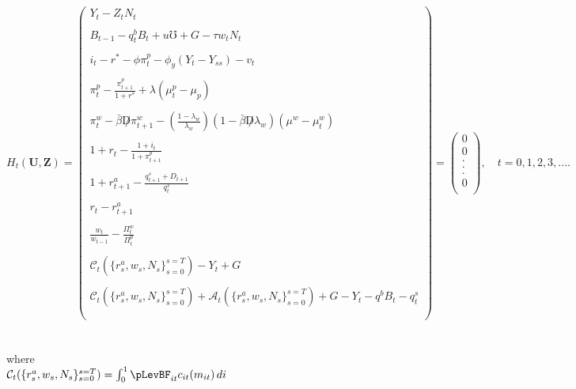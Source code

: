 \documentclass[titlepage]{\econtex}\providecommand{\texname}{FBS-NK}
\begin{document}
$$
H_{t}(\mathbf{U},\mathbf{Z})= \begin{pmatrix} 
 Y_{t} - Z_{t}N_{t} \\ \\ 
B_{t-1} - q^{b}_{t}B_{t} + u\mho + G - \tau w_{t} N_{t} \\ \\  
i_{t} - r^{*} - \phi \pi^{p}_{t} -\phi_{y}(Y_{t}-Y_{ss}) - v_{t} \\ \\
\pi_{t}^{p} -\frac{\pi^{p}_{t+1}}{1+r^{*}} + \lambda(\mu_{t}^{p} -\mu_{p})  \\ \\
 \pi_{t}^{w} -\bar{\beta} \not D \pi_{t+1}^{w} -(\frac{1- \lambda_{w}}{\lambda_{w}}) (1- \bar{\beta}\not D \lambda_{w}) (\mu^{w} -\mu_{t}^{w}) \\ \\
    1+r_{t} - \frac{1 + i_{t}}{1+ \pi^{p}_{t+1}}\\ \\
 1+r_{t+1}^{a} - \frac{q_{t+1}^{s} +D_{t+1}}{q_{t}^{s}} \\ \\
 r_{t} - r_{t+1}^{a} \\ \\
 \frac{w_{t}}{w_{t-1}} - \frac{\Pi_{t}^{w}}{\Pi_{t}^{p}} \\ \\
 \mathcal{C}_{t}(\{r_{s}^{a} ,w_{s}, N_{s}\}_{s=0}^{s=T}) - Y_{t} + G \\ \\
   \mathcal{C}_{t}(\{r_{s}^{a} ,w_{s}, N_{s}\}_{s=0}^{s=T}) + \mathcal{A}_{t}(\{r_{s}^{a} ,w_{s}, N_{s}\}_{s=0}^{s=T}) +G -   Y_{t} - q^{b}B_{t}  -  q^{s}_{t} \\ \\
 \end{pmatrix} = \begin{pmatrix} 0 \\ 0 \\. \\. \\. \\ 0\\ \end{pmatrix} , \quad t=0,1 ,2,3,....
$$ \\ \\
 

 
 where \\
 
$\mathcal{C}_{t}(\{r_{s}^{a} ,w_{s}, N_{s}\}_{s=0}^{s=T}) = \int_{0}^{1} \pLevBF_{it} c_{it}(m_{it})\, di $ \\
 
\end{document}
